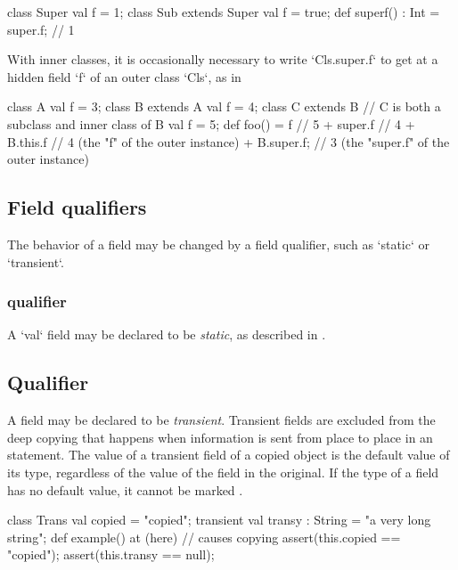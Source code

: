 \begin{xten}
class Super{ 
  val f = 1; 
}
class Sub extends Super {
  val f = true;
  def superf() : Int = super.f; // 1
}
\end{xten}
%

With inner classes, it is occasionally necessary to 
write \xcd`Cls.super.f` to get at a hidden field \xcd`f` of an outer class
\xcd`Cls`, as in 
\begin{xten}
class A {
   val f = 3;
}
class B extends A {
   val f = 4;
   class C extends B {
      // C is both a subclass and inner class of B
      val f = 5;
      def foo()
         = f          // 5
         + super.f    // 4
         + B.this.f   // 4 (the "f" of the outer instance)
         + B.super.f; // 3 (the "super.f" of the outer instance)
    }
}
\end{xten}
%


\subsection{Field qualifiers}
\label{FieldQualifier}

The behavior of a field may be changed by a field qualifier, such as
\xcd`static` or \xcd`transient`.  


\subsubsection{ qualifier}

A \xcd`val` field may be declared to be {\em static}, as described in
. 

\subsection{ Qualifier}

A field may be declared to be {\em transient}.  Transient fields are excluded
from the deep copying that happens when information is sent from place to
place in an  statement.    The value of a transient field of a copied
object is the default value of its type, regardless of the value of the field
in the original.  If the type of a field has no
default value, it cannot be marked .
\begin{xten}
class Trans { 
   val copied = "copied";
   transient val transy : String = "a very long string";
   def example() {
      at (here) { // causes copying
         assert(this.copied == "copied");
         assert(this.transy == null);
      }
   }
}
\end{xten}
%

